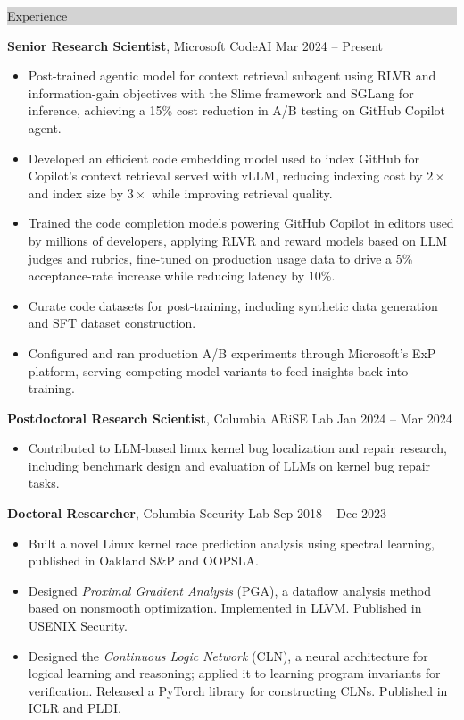 \documentclass{article} %
\newcommand{\rsection}[1]{
  \hspace{-0.4cm}\vspace{0.1cm}
\colorbox{lightgrey}{
\begin{minipage}{1.07\linewidth}
\vspace{0.22cm}
\fontsize{14pt}{16pt}\selectfont #1
\vspace{0.12cm}
\end{minipage}
}
\vspace*{-0.1cm}
}
\newcommand{\rjob}[2]{
  \hspace*{-0.3cm}
{\fontsize{10pt}{12pt}\selectfont #1} \hfill #2
\hspace*{-1.2cm}
}
\newenvironment{ritemize}{
\hspace*{-0.8cm}
\begin{minipage}{1.05\linewidth}
\fontsize{10pt}{11pt}\selectfont
\vspace{0.1cm}
\begin{itemize}[itemsep=0pt,parsep=0pt,topsep=1pt,partopsep=0pt]
}{
\end{itemize}
\end{minipage}
\vspace{-0.1cm}
}
\newcommand{\ritem}{
\item[-]
}
\begin{document}
\rsection{Experience}

\rjob{\textbf{Senior Research Scientist}, Microsoft CodeAI}{Mar 2024 -- Present}\\
\begin{ritemize}
    \ritem Post-trained agentic model for context retrieval subagent using RLVR and information-gain objectives with the Slime framework and SGLang for inference, achieving a 15\% cost reduction in A/B testing on GitHub Copilot agent.
    \ritem Developed an efficient code embedding model used to index GitHub for Copilot's context retrieval served with vLLM, reducing indexing cost by $2\times$ and index size by $3\times$ while improving retrieval quality. 
    \ritem Trained the code completion models powering GitHub Copilot in editors used by millions of developers, applying RLVR and reward models based on LLM judges and rubrics, fine-tuned on production usage data to drive a 5\% acceptance-rate increase while reducing latency by 10\%.
    \ritem Curate code datasets for post-training, including synthetic data generation and SFT dataset construction.
    \ritem Configured and ran production A/B experiments through Microsoft's ExP platform, serving competing model variants to feed insights back into training.
\end{ritemize}

\rjob{\textbf{Postdoctoral Research Scientist}, Columbia ARiSE Lab}{Jan 2024 -- Mar 2024}\\
\begin{ritemize}
    \ritem Contributed to LLM-based linux kernel bug localization and repair research, including benchmark design and evaluation of LLMs on kernel bug repair tasks. 
\end{ritemize}

\rjob{\textbf{Doctoral Researcher}, Columbia Security Lab}{Sep 2018 -- Dec 2023}\\
\begin{ritemize}
    \ritem Built a novel Linux kernel race prediction analysis using spectral learning, published in Oakland S\&P and OOPSLA.
    \ritem Designed \textit{Proximal Gradient Analysis} (PGA), a dataflow analysis method based on nonsmooth optimization. Implemented in LLVM. Published in USENIX Security.
    \ritem Designed the \textit{Continuous Logic Network} (CLN), a neural architecture for logical learning and reasoning; applied it to learning program invariants for verification. Released a PyTorch library for constructing CLNs. Published in ICLR and PLDI.
\end{ritemize}
\end{document}
